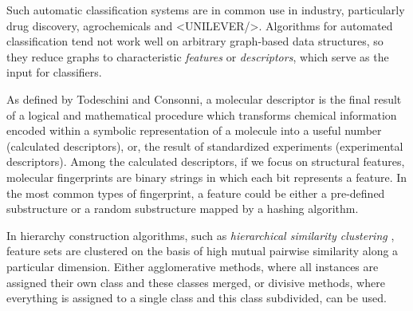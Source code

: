 \documentclass[10pt]{bmc_article}
\newenvironment{bmcformat}{\baselineskip20pt\sloppy\setboolean{publ}{false}}{\baselineskip20pt\sloppy}
\begin{document}
\begin{bmcformat}
Such automatic classification systems are in common use in industry, particularly drug discovery, agrochemicals and <UNILEVER/>.  Algorithms for automated classification tend not work well on arbitrary graph-based data structures, so they reduce graphs to characteristic \textit{features} or \textit{descriptors}, which serve as the input for classifiers. 

As defined by Todeschini and Consonni\cite{Todeschini2000}, a molecular descriptor is the final result of a logical and mathematical procedure which transforms chemical information encoded within a symbolic representation of a molecule into a useful number (calculated descriptors), or, the result of standardized experiments (experimental descriptors). Among the calculated descriptors, if we focus on structural features, molecular fingerprints are binary strings in which each bit represents a feature.  In the most common types of fingerprint, a feature could be either a pre-defined substructure or a random substructure mapped by a hashing algorithm.

In hierarchy construction algorithms, such as \textit{hierarchical similarity clustering} \cite{Adamson1991,barnard1992}, feature sets are clustered on the basis of high mutual pairwise similarity along a particular dimension.  Either agglomerative methods, where all instances are assigned their own class and these classes merged, or divisive methods, where everything is assigned to a single class and this class subdivided, can be used.


\end{bmcformat}
\end{document}
